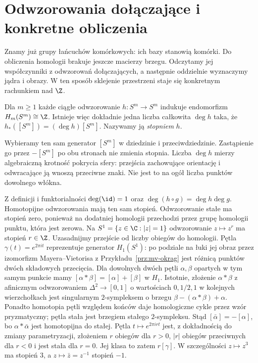 \section{Odwzorowania dołączające i konkretne obliczenia}
\label{sec:obliczenia-homologii}

Znamy już grupy łańcuchów komórkowych: ich bazy stanowią komórki.
Do obliczenia homologii brakuje jeszcze macierzy brzegu.
Odczytamy jej współczynniki z odwzorowań dołączających,
a następnie oddzielnie wyznaczymy jądra i obrazy.
W ten sposób sklejenie przestrzeni staje się
konkretnym rachunkiem nad $\Z$.

\begin{definicja}
\label{def:stopien-sfer}
Dla $m\geq1$ każde ciągłe odwzorowanie
$h:S^m\to S^m$ indukuje
endomorfizm $H_m(S^m)\cong\Z$.
Istnieje więc dokładnie jedna
liczba całkowita $\deg h$ taka,
że $h_*([S^m])=(\deg h)[S^m]$.
Nazywamy ją \emph{stopniem} $h$.
\end{definicja}

Wybieramy ten sam generator $[S^m]$ w dziedzinie i przeciwdziedzinie.
Zastąpienie go przez $-[S^m]$ po obu stronach nie zmienia stopnia.
Liczba $\deg h$ mierzy algebraiczną krotność pokrycia sfery:
przejścia zachowujące orientację i odwracające ją wnoszą przeciwne znaki.
Nie jest to na ogół liczba punktów dowolnego włókna.

Z definicji i funktorialności
$\deg(\id)=1$ oraz
$\deg(h\circ g)=\deg h\deg g$.
Homotopijne odwzorowania mają ten sam
stopień. Odwzorowanie stałe ma stopień zero, ponieważ
na dodatniej homologii przechodzi przez grupę homologii punktu,
która jest zerowa. Na $S^1=\{z\in\C:|z|=1\}$
odwzorowanie $z\mapsto z^r$ ma stopień $r\in\Z$.
Uzasadnijmy przejście od liczby obiegów do homologii.
Pętla $\gamma(t)=e^{2\pi it}$ reprezentuje generator $H_1(S^1)$:
po podziale na łuki jej obraz przez izomorfizm Mayera--Vietorisa
z Przykładu~\ref{prz:mv-okrag} jest różnicą punktów dwóch składowych przecięcia.
Dla dowolnych dwóch pętli $\alpha,\beta$ opartych w tym samym punkcie
mamy $[\alpha*\beta]=[\alpha]+[\beta]$ w $H_1$.
Istotnie, złożenie $\alpha*\beta$ z afinicznym odwzorowaniem
$\Delta^2\to[0,1]$ o wartościach $0,1/2,1$ w kolejnych wierzchołkach
jest singularnym $2$-sympleksem o brzegu
$\beta-(\alpha*\beta)+\alpha$.
Ponadto homotopia pętli względem końców daje homologiczne cykle
przez wzór pryzmatyczny; pętla stała jest brzegiem stałego $2$-sympleksu.
Stąd $[\bar\alpha]=-[\alpha]$, bo $\alpha*\bar\alpha$ jest
homotopijna do stałej. Pętla $t\mapsto e^{2\pi irt}$ jest,
z dokładnością do zmiany parametryzacji, złożeniem $r$ obiegów dla $r>0$,
$|r|$ obiegów przeciwnych dla $r<0$
i jest stała dla $r=0$. Jej klasa to zatem $r[\gamma]$.
W szczególności $z\mapsto z^3$ ma stopień $3$,
a $z\mapsto\bar z=z^{-1}$ stopień $-1$.


